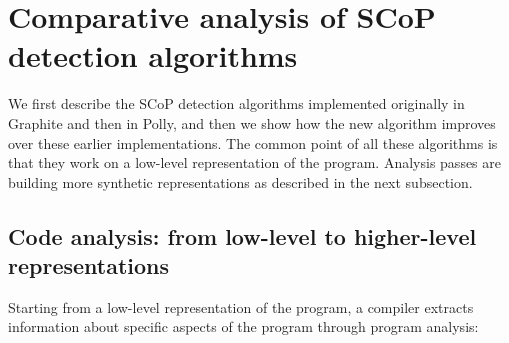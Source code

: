 \documentclass{sig-alternate}
\begin{document}
\section{Comparative analysis of SCoP detection algorithms}

We first describe the SCoP detection algorithms implemented originally in
Graphite and then in Polly, and then we show how the new algorithm improves over
these earlier implementations.  The common point of all these algorithms is that
they work on a low-level representation of the program.  Analysis passes are
building more synthetic representations as described in the next subsection.

\subsection{Code analysis: from low-level to higher-level representations}

Starting from a low-level representation of the program, a compiler extracts
information about specific aspects of the program through program analysis:
\end{document}
